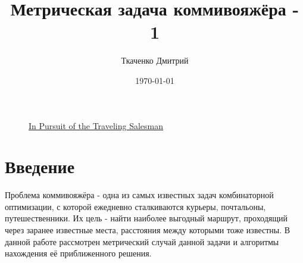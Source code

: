 \documentclass[14pt]{article}
\title{
\textbf{Метрическая задача коммивояжёра - 1} 
}
\date{\today}
\author{Ткаченко Дмитрий}
\begin{document}
    \maketitle
    
    \begin{figure}[h]
		\caption*{\hyperref[book1]{In Pursuit of the Traveling Salesman}}
	\end{figure}
	
	\tableofcontents
	
	
	\section{Введение}
		Проблема коммивояжёра - одна из самых известных задач комбинаторной оптимизации, с которой ежедневно сталкиваются курьеры, почтальоны, путешественники. Их цель - найти наиболее выгодный маршрут, проходящий через заранее известные места, расстояния между которыми тоже известны. В данной работе рассмотрен метрический случай данной задачи и алгоритмы нахождения её приближенного решения.
		
\end{document}
